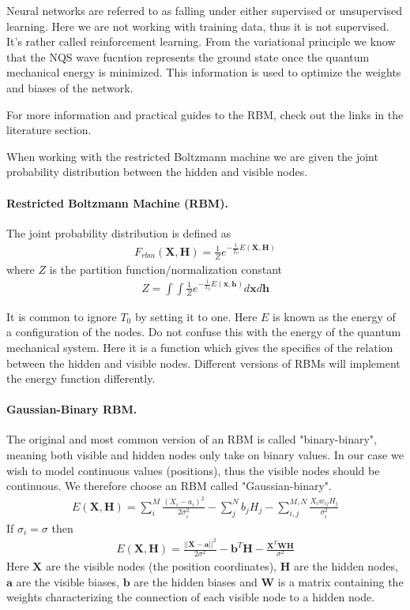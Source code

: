 \documentclass[%
oneside,                 %
final,                   %
10pt]{article}
\begin{document}
Neural networks are referred to as falling
under either supervised or unsupervised learning. Here we are not
working with training data, thus it is not supervised. It's rather
called reinforcement learning. From the variational principle we know
that the NQS wave fucntion represents the ground state once the
quantum mechanical energy is minimized. This information is used to
optimize the weights and biases of the network.

For more information and practical guides to the RBM, check out the links in the literature section.

When working with the restricted Boltzmann machine we are given the joint probability distribution between the hidden and visible nodes.

\paragraph{Restricted Boltzmann Machine (RBM).}
The joint probability distribution is defined as 
\begin{align}
	F_{rbm}(\mathbf{X},\mathbf{H}) = \frac{1}{Z} e^{-\frac{1}{T_0}E(\mathbf{X},\mathbf{H})}
\end{align}
where $Z$ is the partition function/normalization constant
\begin{align}
	Z = \int \int \frac{1}{Z} e^{-\frac{1}{T_0}E(\mathbf{x},\mathbf{h})} d\mathbf{x} d\mathbf{h}
\end{align}

It is common to ignore $T_0$ by setting it to one. Here $E$ is known
as the energy of a configuration of the nodes. Do not confuse this
with the energy of the quantum mechanical system. Here it is a
function which gives the specifics of the relation between the hidden
and visible nodes. Different versions of RBMs will implement the
energy function differently.

\paragraph{Gaussian-Binary RBM.}
The original and most common version of an RBM is called "binary-binary", meaning both visible and hidden nodes only take on binary values. In our case we wish to model continuous values (positions), thus the visible nodes should be continuous. We therefore choose an RBM called "Gaussian-binary". 
\begin{align}
	E(\mathbf{X}, \mathbf{H}) = \sum_i^M \frac{(X_i - a_i)^2}{2\sigma_i^2} - \sum_j^N b_j H_j - \sum_{i,j}^{M,N} \frac{X_i w_{ij} H_j}{\sigma_i^2} 
\end{align}
If $\sigma_i = \sigma$ then
\begin{align}
	E(\mathbf{X}, \mathbf{H})= \frac{||\mathbf{X} - \mathbf{a}||^2}{2\sigma^2} - \mathbf{b}^T \mathbf{H} - \frac{\mathbf{X}^T \mathbf{W} \mathbf{H}}{\sigma^2}
\end{align}
Here $\mathbf{X}$ are the visible nodes (the position coordinates), $\mathbf{H}$ are the hidden nodes, $\mathbf{a}$ are the visible biases, $\mathbf{b}$ are the hidden biases and $\mathbf{W}$ is a matrix containing the weights characterizing the connection of each visible node to a hidden node.
\end{document}
